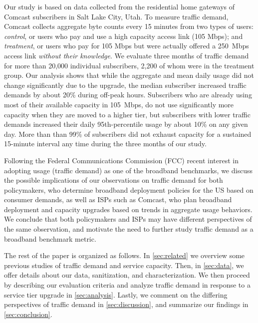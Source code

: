 Our study is based on data collected from the residential home gateways
of Comcast subscribers in Salt Lake City, Utah. To measure traffic
demand, Comcast collects
aggregate byte counts every 15 minutes from two types of
users: {\em control}, or users who pay and use a high capacity access
link (105 Mbps); and {\em treatment}, or users who pay for 105 Mbps but
were actually offered a 250~Mbps access link {\em without their
  knowledge}.  We evaluate three months of traffic demand for more than
20,000 individual subscribers, 2,200 of whom were in the treatment
group. Our analysis shows that while the aggregate and mean daily usage
did not change significantly due to the upgrade, the median subscriber
increased traffic demands by about 20\%
during off-peak hours. Subscribers who are already using most of their
available capacity in 105~Mbps, do not use significantly more capacity
when they are moved to a higher tier, but subscribers with lower traffic demands
increased their daily 95th-percentile usage by about
10\% on any given day. More than than 99\% of subscribers did not
exhaust capacity for a sustained 15-minute interval any time during the
three months of our study.

Following the Federal Communications Commission (FCC) recent interest in
adopting usage (traffic demand) as one of the broadband benchmarks, we
discuss the possible implications of our observations on traffic demand
for both policymakers, who determine broadband deployment policies for
the US based on consumer demands, as well as ISPs such as Comcast, who
plan broadband deployment and capacity upgrades based on trends in
aggregate usage behaviors. We conclude that both policymakers and ISPs
may have different perspectives of the same observation, and motivate
the need to further study traffic demand as a broadband benchmark
metric.

The rest of the paper is organized as follows. In \autoref{sec:related} we 
overview some previous studies of traffic demand and service capacity. Then, in 
\autoref{sec:data}, we offer details about our data, sanitization, and 
characterization. We then proceed by describing our evaluation criteria and 
analyze traffic demand in response to a service tier upgrade in 
\autoref{sec:analysis}.
Lastly, we comment on the differing perspectives of traffic demand in 
\autoref{sec:discussion}, and summarize our findings in 
\autoref{sec:conclusion}.
